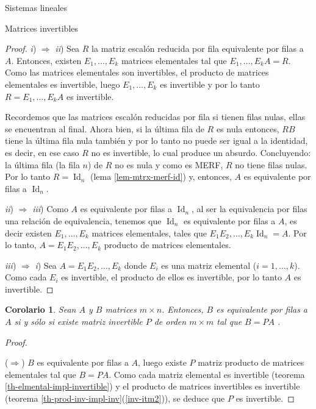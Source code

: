 \documentclass[a4paper,12pt,twoside,spanish,reqno]{amsbook}
\newtheorem{corolario}[teorema]{Corolario}
\theoremstyle{definition}
\theoremstyle{remark}
\newcommand{\Id}{\operatorname{Id}}
\begin{document}
\begin{chapter}{Sistemas lineales}
\begin{section}{Matrices invertibles}
\begin{proof}
                
                \textit{i}) $\Rightarrow$ \textit{ii})\; Sea $R$ la matriz escalón reducida por fila equivalente por filas a $A$. Entonces,  existen $E_1,\ldots,E_k$ matrices elementales tal que $E_1,\ldots,E_kA = R$. Como las matrices elementales son invertibles, el producto de matrices elementales es invertible, luego  $E_1,\ldots,E_k$ es invertible y por lo tanto $R=E_1,\ldots,E_kA$ es invertible. 
                
                Recordemos que las matrices escalón reducidas por fila si tienen filas nulas, ellas se encuentran al final.  Ahora bien,  si la última fila de $R$ es nula entonces,  $RB$ tiene la última fila nula también y por lo tanto no puede ser igual a la identidad, es decir, en ese caso $R$ no es invertible, lo cual produce un absurdo. Concluyendo: la última fila (la fila $n$) de $R$ no es nula y como es MERF, $R$ no tiene filas nulas. Por lo tanto $R=\Id_n$ (lema \ref{lem-mtrx-merf-id}) y,  entonces, $A$ es equivalente por filas a $\Id_n$. 
                
                \textit{ii}) $\Rightarrow$ \textit{iii})\; Como $A$  es equivalente por filas a $\Id_n$, al ser la equivalencia por filas una relación de equivalencia,  tenemos que $\Id_n$ es equivalente por filas a $A$, es decir  existen $E_1,\ldots,E_k$ matrices elementales, tales que $E_1E_2,\ldots,E_k\Id_n = A$. Por lo tanto, $A =E_1E_2,\ldots,E_k$ producto de matrices elementales.
                
                \textit{iii}) $\Rightarrow$ \textit{i}) \; Sea $A = E_1E_2,\ldots,E_k$ donde $E_i$  es una matriz elemental ($i=1,\ldots,k$). Como cada $E_i$ es invertible,  el producto de ellos es invertible,  por lo tanto $A$ es invertible.
            \end{proof}	
            
            \begin{corolario}
                Sean $A$ y $B$ matrices $m \times n$. Entonces,   $B$ es equivalente por filas a $A$ si y sólo si existe matriz invertible $P$ de orden $m \times m$ tal que $B =PA$ . 
            \end{corolario}
            \begin{proof}
                
                \
                
                ($\Rightarrow$) $B$ es equivalente por filas a $A$,  luego existe $P$ matriz producto de matrices elementales tal que $B =PA$. Como cada matriz elemental es invertible (teorema \ref{th-elmental-impl-invertible}) y el producto de matrices invertibles es invertible (teorema  \ref{th-prod-inv-impl-inv}(\ref{inv-itm2})), se deduce que $P$ es invertible. 
                

\end{proof}
\end{section}
\end{chapter}
\end{document}
